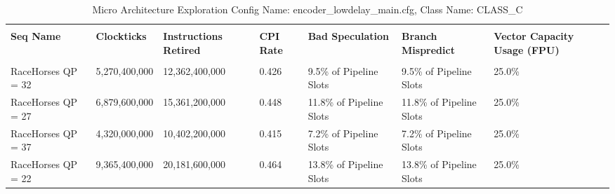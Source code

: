 \documentclass{article}%
\begin{document}
\newpage%
\begin{longtabu}{| X[l] | X[l] | X[l] | X[l] | X[l] | X[l] | X[l] |}%
\caption{%
Micro Architecture Exploration\newline%
 Config Name: encoder\_lowdelay\_main.cfg,\newline%
 Class Name: CLASS\_C\newline%
%
}%
\hline%
&&&&&&\\%
\textbf{Seq Name}&\textbf{Clockticks}&\textbf{Instructions Retired}&\textbf{CPI Rate}&\textbf{Bad Speculation}&\textbf{Branch Mispredict}&\textbf{Vector Capacity Usage (FPU)}\\%
&&&&&&\\%
\hline%
\endhead%
RaceHorses\newline%
 QP = 32&5,270,400,000&12,362,400,000&0.426&9.5\% of Pipeline Slots&9.5\% of Pipeline Slots&25.0\%\\%
\hline%
RaceHorses\newline%
 QP = 27&6,879,600,000&15,361,200,000&0.448&11.8\% of Pipeline Slots&11.8\% of Pipeline Slots&25.0\%\\%
\hline%
RaceHorses\newline%
 QP = 37&4,320,000,000&10,402,200,000&0.415&7.2\% of Pipeline Slots&7.2\% of Pipeline Slots&25.0\%\\%
\hline%
RaceHorses\newline%
 QP = 22&9,365,400,000&20,181,600,000&0.464&13.8\% of Pipeline Slots&13.8\% of Pipeline Slots&25.0\%\\%
\hline%
\end{longtabu}%
\end{document}
